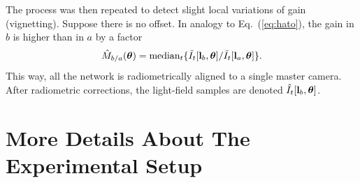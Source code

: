 \documentclass[runningheads]{llncs}
\begin{document}
The process was then repeated to detect slight local variations of gain (vignetting). Suppose there is no offset. In analogy to Eq.~(\ref{eq:hato}), the gain in $b$ is higher than in $a$ by a factor
\begin{equation}
 {\hat M}_{b/a}({\bm \theta})=
  {\rm median}_{t} \{\tilde I_t[{\bf l}_b,{\bm \theta}]/\tilde I_t[{\bf l}_a,{\bm \theta}]\}.
 \label{eq:hatm}
\end{equation}
This way, all the network is radiometrically aligned to a single master camera.
After radiometric corrections, the light-field samples are denoted $\hat I_t[{\bf l}_b,{\bm \theta}]$.


\section{More Details About The Experimental Setup}
\label{sec:set}
\end{document}
